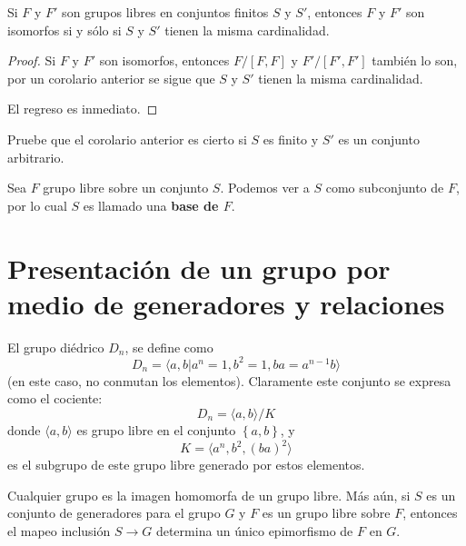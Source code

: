 \documentclass[12pt]{report}
\newcounter{it}
\theoremstyle{largebreak}
\begin{document}
    \begin{cor}
        Si $F$ y $F'$ son grupos libres en conjuntos finitos $S$ y $S'$, entonces $F$ y $F'$ son isomorfos si y sólo si $S$ y $S'$ tienen la misma cardinalidad.
    \end{cor}

    \begin{proof}
        Si $F$ y $F'$ son isomorfos, entonces $F/[F,F]$ y $F'/[F',F']$ también lo son, por un corolario anterior se sigue que $S$ y $S'$ tienen la misma cardinalidad.

        El regreso es inmediato.
    \end{proof}

    \begin{excer}
        Pruebe que el corolario anterior es cierto si $S$ es finito y $S'$ es un conjunto arbitrario.
    \end{excer}

    \begin{mydef}
        Sea $F$ grupo libre sobre un conjunto $S$. Podemos ver a $S$ como subconjunto de $F$, por lo cual $S$ es llamado una \textbf{base de $F$}.
    \end{mydef}

    \section{Presentación de un grupo por medio de generadores y relaciones}

    \begin{exa}
        El grupo diédrico $D_n$, se define como
        \begin{equation*}
            D_n=\langle a,b\Big|a^n=1,b^2=1,ba=a^{n-1}b \rangle
        \end{equation*}
        (en este caso, no conmutan los elementos). Claramente este conjunto se expresa como el cociente:
        \begin{equation*}
            D_n=\langle a,b\rangle/K
        \end{equation*}
        donde $\langle a,b\rangle$ es grupo libre en el conjunto $\left\{a,b \right\}$, y
        \begin{equation*}
            K=\langle a^n,b^2,(ba)^2\rangle
        \end{equation*}
        es el subgrupo de este grupo libre generado por estos elementos.
    \end{exa}

    \begin{propo}
        Cualquier grupo es la imagen homomorfa de un grupo libre. Más aún, si $S$ es un conjunto de generadores para el grupo $G$ y $F$ es un grupo libre sobre $F$, entonces el mapeo inclusión $S\rightarrow G$ determina un único epimorfismo de $F$ en $G$.
    \end{propo}
\end{document}
